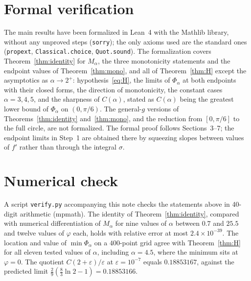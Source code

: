 \documentclass[11pt]{amsart}
\theoremstyle{remark}
\begin{document}
\section{Formal verification}\label{sec:lean}

\begin{sloppypar}
The main results have been formalized in Lean~4 with the Mathlib library, without any
unproved steps (\texttt{sorry}); the only axioms used are the standard ones
(\texttt{propext}, \texttt{Classical.choice}, \texttt{Quot.sound}). The formalization
covers Theorem~\ref{thm:identity} for $M_\alpha$, the three monotonicity statements and
the endpoint values of Theorem~\ref{thm:mono}, and all of Theorem~\ref{thm:H} except the
asymptotics as $\alpha\to2^+$: hypothesis~\eqref{eq:H}, the limits of $\Phi_\alpha$ at
both endpoints with their closed forms, the direction of monotonicity, the constant cases
$\alpha=3,4,5$, and the sharpness of $C(\alpha)$, stated as $C(\alpha)$ being the greatest
lower bound of $\Phi_\alpha$ on $(0,\pi/6)$. The general-$g$ versions of
Theorems~\ref{thm:identity} and~\ref{thm:mono}, and the reduction from $[0,\pi/6]$ to the
full circle, are not formalized. The formal proof follows Sections~3--7; the endpoint
limits in Step~1 are obtained there by squeezing slopes between values of $f'$ rather
than through the integral $\sigma$.
\end{sloppypar}

\section{Numerical check}\label{sec:numerics}

A script \texttt{verify.py} accompanying this note checks the statements above in
40-digit arithmetic (mpmath). The identity of Theorem~\ref{thm:identity}, compared with
numerical differentiation of $M_\alpha$ for nine values of $\alpha$ between $0.7$ and
$25.5$ and twelve values of $\varphi$ each, holds with relative error at most
$2.4\times10^{-39}$. The location and value of $\min\Phi_\alpha$ on a $400$-point grid
agree with Theorem~\ref{thm:H} for all eleven tested values of $\alpha$, including
$\alpha=4.5$, where the minimum sits at $\varphi=0$. The quotient
$C(2+\varepsilon)/\varepsilon$ at $\varepsilon=10^{-7}$ equals $0.18853167$, against the
predicted limit $\frac29(\frac83\ln2-1)=0.18853166$.
\end{document}
